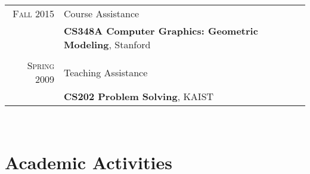 \documentclass[letterpaper,10pt]{article} %
\newcommand{\blankline}{\quad\pagebreak[2]}
\begin{document}
{\begin{tabular}{r|p{11cm}}

\textsc{Fall 2015} & Course Assistance\\
& \textbf{CS348A Computer Graphics: Geometric Modeling}, Stanford\\
& \\


\textsc{Spring 2009} & Teaching Assistance\\
& \textbf{CS202 Problem Solving}, KAIST\\
\end{tabular}\\

\blankline



%
%


\section{Academic Activities}

}
\end{document}
